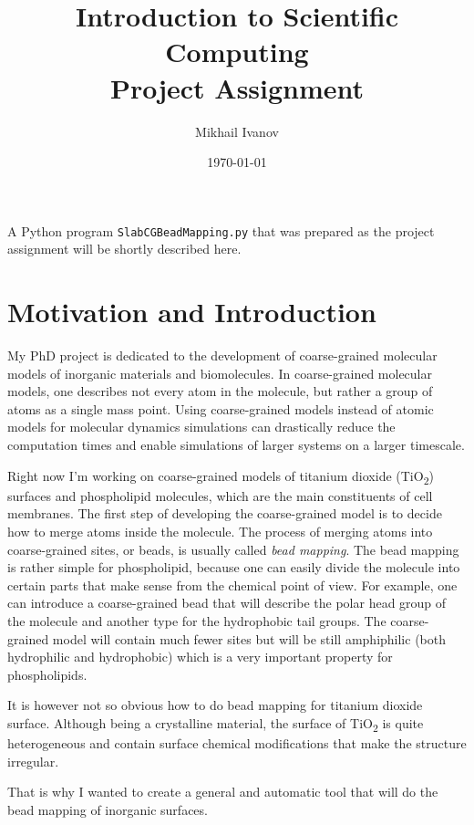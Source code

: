 \documentclass[11pt]{article}
\begin{document}
\title{\textbf{Introduction to Scientific Computing}\\Project Assignment}
\date{\today}
\author{Mikhail Ivanov}
\maketitle

A Python program \texttt{SlabCGBeadMapping.py} that was prepared as the project assignment will be shortly described here.

\section{Motivation and Introduction}

My PhD project is dedicated to the development of coarse-grained molecular models of inorganic materials and biomolecules. In coarse-grained molecular models, one describes not every atom in the molecule, but rather a group of atoms as a single mass point. Using coarse-grained models instead of atomic models for molecular dynamics simulations can drastically reduce the computation times and enable simulations of larger systems on a larger timescale.

Right now I'm working on coarse-grained models of titanium dioxide (TiO\textsubscript{2}) surfaces and phospholipid molecules, which are the main constituents of cell membranes. The first step of developing the coarse-grained model is to decide how to merge atoms inside the molecule. The process of merging atoms into coarse-grained sites, or beads, is usually called \textit{bead mapping}. The bead mapping is rather simple for phospholipid, because one can easily divide the molecule into certain parts that make sense from the chemical point of view. For example, one can introduce a coarse-grained bead that will describe the polar head group of the molecule and another type for the hydrophobic tail groups. The coarse-grained model will contain much fewer sites but will be still amphiphilic (both hydrophilic and hydrophobic) which is a very important property for phospholipids.

It is however not so obvious how to do bead mapping for titanium dioxide surface. Although being a crystalline material, the surface of TiO\textsubscript{2} is quite heterogeneous and contain surface chemical modifications that make the structure irregular.

That is why I wanted to create a general and automatic tool that will do the bead mapping of inorganic surfaces.
\end{document}
